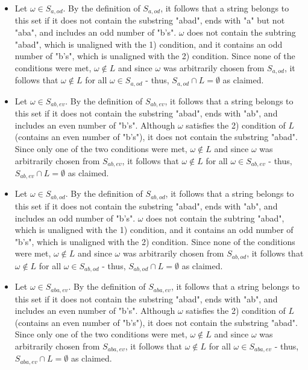 \documentclass{article}
\begin{document}
\begin{itemize}
    \item Let $\omega \in S_{a,od}$. By the definition of $S_{a,od}$, it follows that a string belongs to this set if it does not contain the substring "abad", ends with "a" but not "aba",
    and includes an odd number of "b's". $\omega$ does not contain the subtring "abad", which is unaligned with the 1) condition, and it contains an odd number of "b's", which is unaligned with the 2) condition.
    Since none of the conditions were met, $\omega \notin L$ and since $\omega$ was arbitrarily chosen from $S_{a,od}$, it follows that $\omega \notin L$ for all $\omega \in S_{a,od}$ - thus, $S_{a,od} \cap L = \emptyset$
    as claimed.

    \item Let $\omega \in S_{ab,ev}$. By the definition of $S_{ab,ev}$, it follows that a string belongs to this set if it does not contain the substring "abad", ends with "ab", and includes an even number of "b's". 
    Although $\omega$ satisfies the 2) condition of $L$ (contains an even number of "b's"), it does not contain the substring "abad". Since only one of the two conditions were met, $\omega \notin L$ and since $\omega$ 
    was arbitrarily chosen from $S_{ab,ev}$, it follows that $\omega \notin L$ for all $\omega \in S_{ab,ev}$ - thus, $S_{ab,ev} \cap L = \emptyset$ as claimed.

    \item Let $\omega \in S_{ab,od}$. By the definition of $S_{ab,od}$, it follows that a string belongs to this set if it does not contain the substring "abad", ends with "ab", and includes an odd number of "b's". 
    $\omega$ does not contain the subtring "abad", which is unaligned with the 1) condition, and it contains an odd number of "b's", which is unaligned with the 2) condition. Since none of the conditions were met, 
    $\omega \notin L$ and since $\omega$ was arbitrarily chosen from $S_{ab,od}$, it follows that $\omega \notin L$ for all $\omega \in S_{ab,od}$ - thus, $S_{ab,od} \cap L = \emptyset$ as claimed.

    \item Let $\omega \in S_{aba,ev}$. By the definition of $S_{aba,ev}$, it follows that a string belongs to this set if it does not contain the substring "abad", ends with "ab", and includes an even number of "b's". 
    Although $\omega$ satisfies the 2) condition of $L$ (contains an even number of "b's"), it does not contain the substring "abad". Since only one of the two conditions were met, $\omega \notin L$ and since $\omega$ 
    was arbitrarily chosen from $S_{aba,ev}$, it follows that $\omega \notin L$ for all $\omega \in S_{aba,ev}$ - thus, $S_{aba,ev} \cap L = \emptyset$ as claimed.


\end{itemize}
\end{document}
